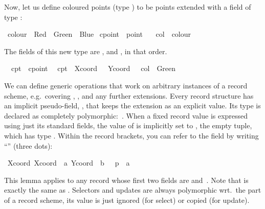 \begin{isabellebody}
\begin{isamarkuptext}
  Now, let us define coloured points (type ) to be
  points extended with a field  of type :%
\end{isamarkuptext}%
\isamarkuptrue%
\ colour\ {\isacharequal}\ Red\ {\isacharbar}\ Green\ {\isacharbar}\ Blue\isanewline
\isanewline
\isamarkupfalse%
\ cpoint\ {\isacharequal}\ point\ {\isacharplus}\isanewline
\ \ col\ {\isacharcolon}{\isacharcolon}\ colour\isamarkupfalse%
%
\begin{isamarkuptext}%
The fields of this new type are ,  and
  , in that order.%
\end{isamarkuptext}%
\isamarkuptrue%
\isanewline
\ \ cpt{}\ {\isacharcolon}{\isacharcolon}\ cpoint\isanewline
\ \ {\isachardoublequote}cpt{}\ {\isasymequiv}\ {\isasymlparr}Xcoord\ {\isacharequal}\ {}{}{}{\isacharcomma}\ Ycoord\ {\isacharequal}\ {}{}{\isacharcomma}\ col\ {\isacharequal}\ Green{\isasymrparr}{\isachardoublequote}\isamarkupfalse%
%
\begin{isamarkuptext}%
\medskip We can define generic operations that work on arbitrary
  instances of a record scheme, e.g.\ covering , , and any further extensions.  Every record structure has an
  implicit pseudo-field, , that keeps the extension as an
  explicit value.  Its type is declared as completely
  polymorphic:~.  When a fixed record value is expressed
  using just its standard fields, the value of  is
  implicitly set to \isa{{\isacharparenleft}{\isacharparenright}}, the empty tuple, which has type
  .  Within the record brackets, you can refer to the
   field by writing ``\isa{{\isasymdots}}'' (three dots):%
\end{isamarkuptext}%
\isamarkuptrue%
\ {\isachardoublequote}Xcoord\ {\isasymlparr}Xcoord\ {\isacharequal}\ a{\isacharcomma}\ Ycoord\ {\isacharequal}\ b{\isacharcomma}\ {\isasymdots}\ {\isacharequal}\ p{\isasymrparr}\ {\isacharequal}\ a{\isachardoublequote}\isanewline
\ \ \isamarkupfalse%
\isamarkupfalse%
%
\begin{isamarkuptext}%
This lemma applies to any record whose first two fields are  and~.  Note that  is exactly the same as .  Selectors and updates are always polymorphic wrt.\ the
   part of a record scheme, its value is just ignored (for
  select) or copied (for update).


\end{isamarkuptext}
\end{isabellebody}
